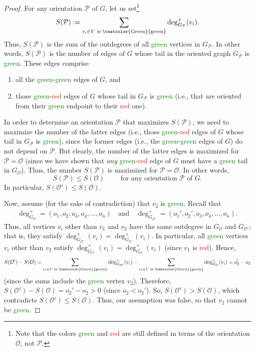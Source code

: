 \documentclass[12pt]{article}
\theoremstyle{definition}
\theoremstyle{remark}
\newcommand{\Green}[1]{\textcolor{Green}{#1}}
\newcommand{\Red}[1]{\textcolor{Red}{#1}}
\newcommand{\Or}{\mathcal{O}}
\begin{document}
\begin{proof}
	For any orientation $\mathcal{P}$ of $G$, let us set\footnote{Note that the colors \Green{green} and \Red{red} are still defined in terms of the orientation $\Or$, not $\mathcal{P}$.}
	\[
	S(\mathcal{P}) := \sum_{v_i \in V \text{ is \Green{green}}} \deg_{G_{\mathcal{P}}}^+(v_i).
	\]
	Thus, $S(\mathcal{P})$ is the sum of the outdegrees of all \Green{green} vertices in $G_{\mathcal{P}}$.
    In other words, $S(\mathcal{P})$ is the number of edges of $G$ whose tail in the oriented graph $G_{\mathcal{P}}$ is \Green{green}.
	These edges comprise
	\begin{enumerate}
	\item all the \Green{green}-\Green{green} edges of $G$, and
	\item those \Green{green}-\Red{red} edges of $G$ whose tail in $G_{\mathcal{P}}$ is \Green{green} (i.e., that are oriented from their \Green{green} endpoint to their \Red{red} one).
	\end{enumerate}
	In order to determine an orientation $\mathcal{P}$ that maximizes $S(\mathcal{P})$, we need to maximize the number of the latter edges (i.e., those \Green{green}-\Red{red} edges of $G$ whose tail in $G_{\mathcal{P}}$ is \Green{green}), since the former edges (i.e., the \Green{green}-\Green{green} edges of $G$) do not depend on $\mathcal{P}$.
	But clearly, the number of the latter edges is maximized for $\mathcal{P} = \Or$ (since we have shown that \textit{any} \Green{green}-\Red{red} edge of $G$ must have a \Green{green} tail in $G_{\mathcal{O}}$).
	Thus, the number $S(\mathcal{P})$ is maximized for $\mathcal{P} = \Or$. In other words,
	\[
	S(\mathcal{P}) \le S(\Or) \qquad \text{ for any orientation } \mathcal{P} \text{ of } G.
	\]
	In particular, $S(\mathcal{O}') \le S(\mathcal{O})$.
	
	Now, assume (for the sake of contradiction) that $v_2$ is \Green{green}.
    Recall that \begin{align*}
        \deg^+_{G_\mathcal{O}} = (o_1,o_2,o_3,o_4,\ldots,o_n) \quad \text{and} \quad \deg_{G_{\mathcal{O}'}}^+ = (o_1',o_2',o_3,o_4,\ldots,o_n).
    \end{align*}
	Thus, all vertices $v_i$ other than $v_1$ and $v_2$ have the same outdegree in $G_\mathcal{O}$ and $G_{\mathcal{O}'}$; that is, they satisfy $\deg_{G_{\mathcal{O}'}}^+(v_i) = \deg_{G_{\mathcal{O}}}^+(v_i)$.
	In particular, all \Green{green} vertices $v_i$ other than $v_2$ satisfy $\deg_{G_{\mathcal{O}'}}^+(v_i) = \deg_{G_{\mathcal{O}}}^+(v_i)$
	(since $v_1$ is \Red{red}).
	Hence, \begin{align*}
        S(\mathcal{O}') - S(\mathcal{O})
		=  \sum_{v_i \in V \text{ is \Green{green}}} \deg_{G_{\mathcal{O}'}}^+(v_i)
      		- \sum_{v_i \in V \text{ is \Green{green}}} \deg_{G_{\mathcal{O}}}^+(v_i)
		= o_2'-o_2
    \end{align*}
	(since the sums include the \Green{green} vertex $v_2$). 
	Therefore, $S(\mathcal{O}') - S(\mathcal{O}) =  o_2' - o_2 > 0$ (since $o_2 < o_2'$).
	So, $S(\mathcal{O}') > S(\mathcal{O})$, which contradicts $S(\mathcal{O}') \le S(\mathcal{O})$.
	Thus, our assumption was false, so that $v_2$ cannot be \Green{green}.
	

\end{proof}
\end{document}
